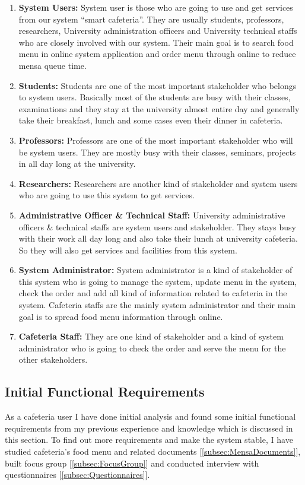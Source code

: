 \begin{enumerate}
\item \textbf{System Users:} System user is those who are going to use and get
services from our system ``smart cafeteria''. They are usually students,
professors, researchers, University administration officers and University
technical staffs who are closely involved with our system. Their main goal is to
search food menu in online system application and order menu through online to
reduce mensa queue time.
\item \textbf{Students:} Students are one of the most important stakeholder who
belongs to system users. Basically most of the students are busy with their
classes, examinations and they stay at the university almost entire day and
generally take their breakfast, lunch and some cases even their dinner in
cafeteria.
\item \textbf{Professors:} Professors are one of the most important stakeholder
who will be system users. They are mostly busy with their classes, seminars,
projects in all day long at the university.
\item \textbf{Researchers:} Researchers are another kind of stakeholder and
system users who are going to use this system to get services.
\item \textbf{Administrative Officer \& Technical Staff:} University
administrative officers \& technical staffs are system users and stakeholder.
They stays busy with their work all day long and also take their lunch at
university cafeteria. So they will also get services and facilities from this
system.
\item \textbf{System Administrator:} System administrator is a kind of
stakeholder of this system who is going to manage the system, update menu in the
system, check the order and add all kind of information related to cafeteria in
the system. Cafeteria staffs are the mainly system administrator and their main
goal is to spread food menu information through online.
\item \textbf{Cafeteria Staff:} They are one kind of stakeholder and a
kind of system administrator who is going to check the order and serve the menu
for the other stakeholders.
\end{enumerate}

\subsection{Initial Functional Requirements}
\label{subsec:FR}
As a cafeteria user I have done initial analysis and found some initial
functional requirements from my previous experience and knowledge  which is
discussed in this section. To find out more requirements and make the system
stable, I have studied cafeteria's food menu and related documents
[\ref{subsec:MensaDocuments}], built focus group [\ref{subsec:FocusGroup}] and
conducted interview with questionnaires [\ref{subsec:Questionnaires}].

